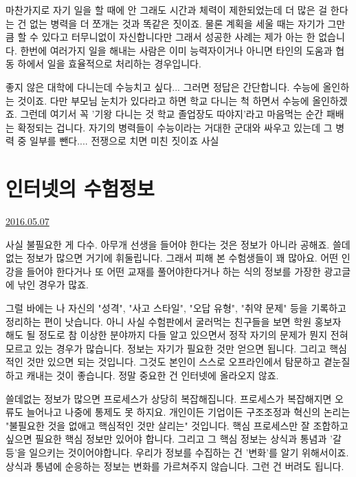 마찬가지로 자기 일을 할 때에 안 그래도 시간과 체력이 제한되었는데 더 많은 걸 한다는 건 없는 병력을 더 쪼개는 것과 똑같은 짓이죠.
물론 계획을 세울 때는 자기가 그만큼 할 수 있다고 터무니없이 자신합니다만 그래서 성공한 사례는 제가 아는 한 없습니다.
한번에 여러가지 일을 해내는 사람은 이미 능력자이거나 아니면 타인의 도움과 협동 하에서 일을 효율적으로 처리하는 경우입니다.
\vspace{5mm}

좋지 않은 대학에 다니는데 수능치고 싶다... 그러면 정답은 간단합니다. 수능에 올인하는 것이죠.
다만 부모님 눈치가 있다라고 하면 학교 다니는 척 하면서 수능에 올인하겠죠.
그런데 여기서 꼭 '기왕 다니는 것 학교 졸업장도 따야지'라고 마음먹는 순간 패배는 확정되는 겁니다.
자기의 병력들이 수능이라는 거대한 군대와 싸우고 있는데 그 병력 중 일부를 뺀다.... 전쟁으로 치면 미친 짓이죠 사실
\vspace{5mm}







\section{인터넷의 수험정보}
\href{https://www.kockoc.com/Apoc/764299}{2016.05.07}

\vspace{5mm}

사실 불필요한 게 다수.
아무개 선생을 들어야 한다는 것은 정보가 아니라 공해죠.
쓸데없는 정보가 많으면 거기에 휘둘립니다. 그래서 피해 본 수험생들이 꽤 많아요.
어떤 인강을 들어야 한다거나 또 어떤 교재를 풀어야한다거나 하는 식의 정보를 가장한 광고글에 낚인 경우가 많죠.
\vspace{5mm}

그럴 바에는 나 자신의 "성격", "사고 스타일", "오답 유형", "취약 문제" 등을 기록하고 정리하는 편이 낫습니다.
아니 사실 수험판에서 굴러먹는 친구들을 보면 학원 홍보자 해도 될 정도로 참 이상한 분야까지 다들 알고 있으면서
정작 자기의 문제가 뭔지 전혀 모르고 있는 경우가 많습니다.
정보는 자기가 필요한 것만 얻으면 됩니다. 그리고 핵심적인 것만 있으면 되는 것입니다.
그것도 본인이 스스로 오프라인에서 탐문하고 곁눈질하고 캐내는 것이 좋습니다. 정말 중요한 건 인터넷에 올라오지 않죠.
\vspace{5mm}

쓸데없는 정보가 많으면 프로세스가 상당히 복잡해집니다. 프로세스가 복잡해지면 오류도 늘어나고 나중에 통제도 못 하지요.
개인이든 기업이든 구조조정과 혁신의 논리는 "불필요한 것을 없애고 핵심적인 것만 살리는" 것입니다.
핵심 프로세스만 잘 조합하고 싶으면 필요한 핵심 정보만 있어야 합니다.
그리고 그 핵심 정보는 상식과 통념과 '갈등'을 일으키는 것이어야합니다. 우리가 정보를 수집하는 건 '변화'를 알기 위해서이죠.
상식과 통념에 순응하는 정보는 변화를 가르쳐주지 않습니다. 그런 건 버려도 됩니다.
\vspace{5mm}

